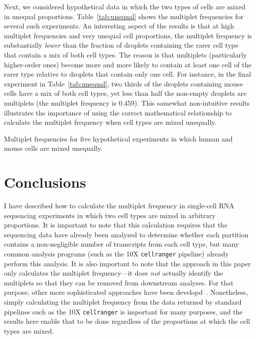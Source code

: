 \documentclass[fleqn,10pt,lineno]{wlpeerj} %
\begin{document}
Next, we considered hypothetical data in which the two types of cells are mixed in unequal proportions.
Table~\ref{tab:unequal} shows the multiplet frequencies for several such experiments.
An interesting aspect of the results is that at high multiplet frequencies and very unequal cell proportions, the multiplet frequency is substantially \emph{lower} than the fraction of droplets containing the rarer cell type that contain a mix of both cell types.
The reason is that multiplets (particularly higher-order ones) become more and more likely to contain at least one cell of the rarer type relative to droplets that contain only one cell.
For instance, in the final experiment in Table~\ref{tab:unequal}, two thirds of the droplets containing mouse cells have a mix of both cell types, yet less than half the non-empty droplets are multiplets (the multiplet frequency is 0.459).
This somewhat non-intuitive results illustrates the importance of using the correct mathematical relationship to calculate the multiplet frequency when cell types are mixed unequally.

\begin{table}[t]
\centering

\caption{\label{tab:unequal}
Multiplet frequencies for five hypothetical experiments in which human and mouse cells are mixed unequally.}
\end{table}

\section*{Conclusions}
I have described how to calculate the multiplet frequency in single-cell RNA sequencing experiments in which two cell types are mixed in arbitrary proportions.
It is important to note that this calculation requires that the sequencing data have already been analyzed to determine whether each partition contains a non-negligible number of transcripts from each cell type, but many common analysis programs (such as the 10X \texttt{cellranger} pipeline) already perform this analysis.
It is also important to note that the approach in this paper only calculates the multiplet frequency---it does \emph{not} actually identify the multiplets so that they can be removed from downstream analyses.
For that purpose, other more sophisticated approaches have been developd~\citep{ilicic2016classification,stoeckius2017cell,kang2018multiplexed}.
Nonetheless, simply calculating the multiplet frequency from the data returned by standard pipelines such as the 10X \texttt{cellranger} is important for many purposes, and the results here enable that to be done regardless of the proportions at which the cell types are mixed.
\end{document}
